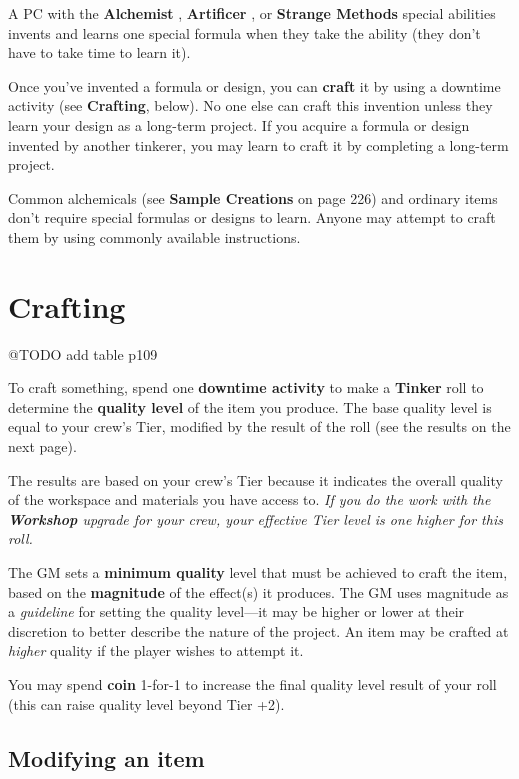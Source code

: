 \documentclass[11pt,oneside]{book}
\newcommand{\gameterm}[1]{\textbf{#1}}
\begin{document}
A PC with the \gameterm{Alchemist} , \gameterm{Artificer} , or \gameterm{Strange Methods}  special abilities invents and learns one special formula when they take the ability (they don’t have to take time to learn it).

Once you’ve invented a formula or design, you can \textbf{craft} it by using a downtime activity (see \textbf{Crafting}, below). No one else can craft this invention unless they learn your design as a long-term project. If you acquire a formula or design invented by another tinkerer, you may learn to craft it by completing a long-term project.

Common alchemicals (see \textbf{Sample Creations} on page 226) and ordinary items don’t require special formulas or designs to learn. Anyone may attempt to craft them by using commonly available instructions.

\section{Crafting}

@TODO add table p109

To craft something, spend one \textbf{downtime activity} to make a \gameterm{Tinker}  roll to determine the \textbf{quality level} of the item you produce. The base quality level is equal to your crew’s Tier, modified by the result of the roll (see the results on the next page).

The results are based on your crew’s Tier because it indicates the overall quality of the workspace and materials you have access to. \emph{If you do the work with the \textbf{Workshop} upgrade for your crew, your effective Tier level is one higher for this roll.}

The GM sets a \textbf{minimum quality} level that must be achieved to craft the item, based on the \textbf{magnitude} of the effect(s) it produces. The GM uses magnitude as a \emph{guideline} for setting the quality level---it may be higher or lower at their discretion to better describe the nature of the project. An item may be crafted at \emph{higher} quality if the player wishes to attempt it.

You may spend \gameterm{coin}  1-for-1 to increase the final quality level result of your roll (this can raise quality level beyond Tier +2).

\subsection{Modifying an item}
\end{document}
